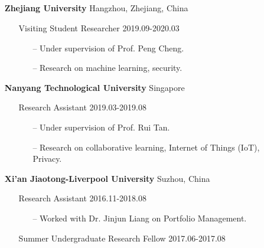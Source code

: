 \documentclass[11pt]{article}
\begin{document}
\subsection*{}
\begin{itemize}[leftmargin=0em, noitemsep, nolistsep]
    \setlength\itemsep{1em}
    \item[] \large\textbf{Zhejiang University} \hfill Hangzhou, Zhejiang, China
        \begin{itemize}[noitemsep, nolistsep, leftmargin=0em]
            \item[] {Visiting Student Researcher} \hfill 2019.09-2020.03
             \begin{itemize}
                \small
                \item[--] Under supervision of Prof. Peng Cheng.
                \item[--] Research on machine learning, security.
             \end{itemize}
        \end{itemize} 
    \item[] \large\textbf{Nanyang Technological University} \hfill Singapore
        \begin{itemize}[noitemsep, nolistsep, leftmargin=0em]
            \item[] Research Assistant \hfill 2019.03-2019.08
             \begin{itemize}
                \small
                \item[--] Under supervision of Prof. Rui Tan.
                \item[--] Research on collaborative learning, Internet of Things (IoT), Privacy.
             \end{itemize}
        \end{itemize} 
    \item[] \large\textbf{Xi'an Jiaotong-Liverpool University} \hfill Suzhou, China
        \begin{itemize}[noitemsep, nolistsep, leftmargin=0em]
            \item[] Research Assistant \hfill 2016.11-2018.08
             \begin{itemize}
                \small
                \item[--] Worked with Dr. Jinjun Liang on Portfolio Management.
             \end{itemize}
            \item[] Summer Undergraduate Research Fellow \hfill 2017.06-2017.08
             \begin{itemize}

\end{itemize}
\end{itemize}
\end{itemize}
\end{document}
